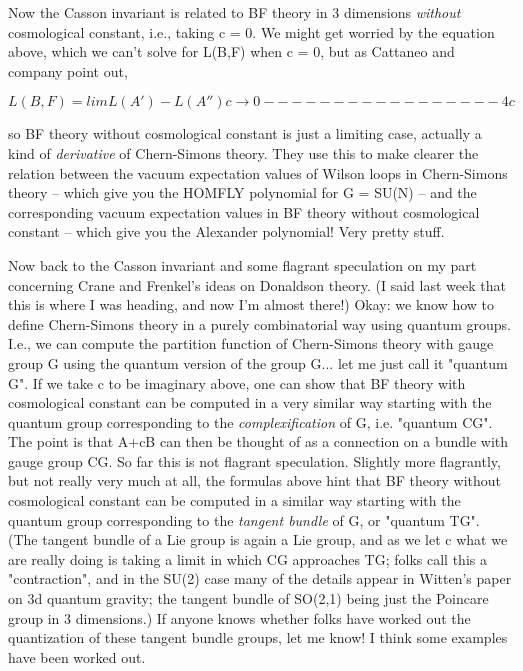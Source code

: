 Now the Casson invariant is related to BF theory in 3 dimensions 
\emph{without} cosmological constant, i.e., taking c = 0.  We might
get worried by the equation above, which we can't solve
for L(B,F) when c = 0, but as Cattaneo and company point out,

$$
L(B,F) = lim       L(A') - L(A'')
        c \to  0    -----------------
                         4c
$$
    

so BF theory without cosmological constant is just a limiting
case, actually a kind of \emph{derivative} of Chern-Simons theory.
They use this to make clearer the relation between the vacuum
expectation values of Wilson loops in Chern-Simons theory --
which give you the HOMFLY polynomial for G = SU(N) -- and
the corresponding vacuum expectation values in BF theory without
cosmological constant -- which give you the Alexander polynomial!
Very pretty stuff.

Now back to the Casson invariant and some flagrant speculation
on my part concerning Crane and Frenkel's ideas on Donaldson theory.
(I said last week that this is where I was heading, and now I'm
almost there!)  Okay: we know how to define Chern-Simons theory
in a purely combinatorial way using quantum groups.  I.e., we
can compute the partition function of Chern-Simons theory with
gauge group G using the quantum version of the group G... let
me just call it "quantum G".  If we take c to be imaginary above, 
one can show that BF theory with cosmological constant can be
computed in a very similar way starting with the quantum group
corresponding to the \emph{complexification} of G, i.e. 
"quantum CG".
The point is that A+cB can then be thought of as a connection on 
a bundle with gauge group CG.  So far this is not flagrant
speculation.  Slightly more flagrantly, but not really very much at 
all, the formulas above hint that BF theory without cosmological
constant can be computed in a similar way starting with the
quantum group corresponding to the \emph{tangent bundle} of G, or
"quantum TG".  (The tangent bundle of a Lie group is again
a Lie group, and as we let c  what we are really doing is
taking a limit in which CG approaches TG; folks call this a
"contraction", and in the SU(2) case many of the details appear
in Witten's paper on 3d quantum gravity; the tangent bundle
of SO(2,1) being just the Poincare group in 3 dimensions.)  If
anyone knows whether folks have worked out the quantization of
these tangent bundle groups, let me know!  I think some examples
have been worked out.

